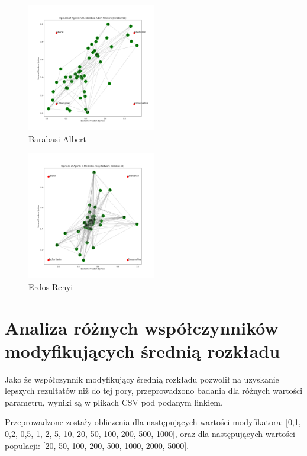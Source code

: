 \documentclass{wfiisul}
\begin{document}
\begin{figure}
  \centering
  \includegraphics[width=0.5\textwidth]{img/Barabasi-Albert.png}
  \caption{Barabasi-Albert}
  \label{fig:Barabasi-Albert}
\end{figure}

\begin{figure}
  \centering
  \includegraphics[width=0.5\textwidth]{img/Erdos-Renyi.png}
  \caption{Erdos-Renyi}
  \label{fig:Erdos-Renyi}
\end{figure}


\section{Analiza różnych współczynników modyfikujących średnią rozkładu}

Jako że współczynnik modyfikujący średnią rozkładu pozwolił na uzyskanie lepszych rezultatów niż do tej pory, przeprowadzono badania dla różnych wartości parametru, wyniki są w plikach CSV pod podanym linkiem.

Przeprowadzone zostały obliczenia dla następujących wartości modyfikatora: [0,1, 0,2, 0,5, 1, 2, 5, 10, 20, 50, 100, 200, 500, 1000],
oraz dla następujących wartości populacji: [20, 50, 100, 200, 500, 1000, 2000, 5000].
\end{document}
